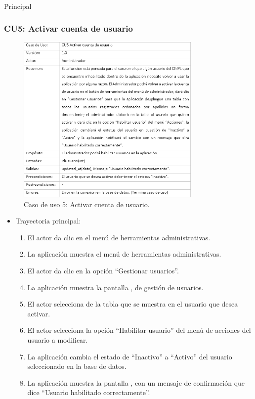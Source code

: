 \begin{UCtrayectoria}{Principal}
\newpage
			
		\subsubsection{CU5: Activar cuenta de usuario}
			\begin{figure}[htbp!]
				\centering
					\includegraphics[width=0.8\textwidth]{images/CU/CU5}
					\caption{Caso de uso 5: Activar cuenta de usuario.}
				\label{Tabla}
			\end{figure}
			
			\begin{itemize}
				\item Trayectoria principal:
					\begin{enumerate}
						\item El actor da clic en el menú de herramientas administrativas.
						\item La aplicación muestra el menú de herramientas administrativas.
						\item El actor da clic en la opción ``Gestionar usuarios''.
						\item La aplicación muestra la pantalla , de gestión de usuarios.
						\item El actor selecciona de la tabla que se muestra en  el usuario que desea activar.
						\item El actor selecciona la opción ``Habilitar usuario'' del menú de acciones del usuario a modificar.
						\item La aplicación cambia el estado de ``Inactivo'' a ``Activo'' del usuario seleccionado en la base de datos.
						\item La aplicación muestra la pantalla , con un mensaje de confirmación que dice ``Usuario habilitado correctamente''.
					\end{enumerate}
			\end{itemize}
			

\end{UCtrayectoria}
